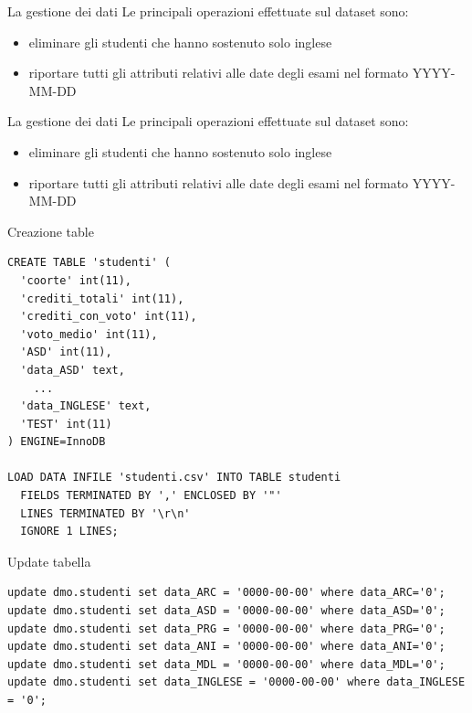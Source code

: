 \documentclass{beamer}
\begin{document}
    \begin{frame}{La gestione dei dati}
        Le principali operazioni effettuate sul dataset sono:
        \begin{itemize}
            \item eliminare gli studenti che hanno sostenuto solo inglese
            \item riportare tutti gli attributi relativi alle date degli esami nel formato YYYY-MM-DD
        \end{itemize}
    \end{frame}

    \begin{frame}{La gestione dei dati}
        Le principali operazioni effettuate sul dataset sono:
        \begin{itemize}
            \item eliminare gli studenti che hanno sostenuto solo inglese
            \item riportare tutti gli attributi relativi alle date degli esami nel formato YYYY-MM-DD
        \end{itemize}
    \end{frame}

\begin{frame}[fragile]{Creazione table}
\begin{lstlisting}[style=sql]
CREATE TABLE 'studenti' (
  'coorte' int(11),
  'crediti_totali' int(11),
  'crediti_con_voto' int(11),
  'voto_medio' int(11),
  'ASD' int(11),
  'data_ASD' text,
    ...
  'data_INGLESE' text,
  'TEST' int(11)
) ENGINE=InnoDB

LOAD DATA INFILE 'studenti.csv' INTO TABLE studenti
  FIELDS TERMINATED BY ',' ENCLOSED BY '"'
  LINES TERMINATED BY '\r\n'
  IGNORE 1 LINES; 
\end{lstlisting}
\end{frame}

\begin{frame}[fragile]{Update tabella}
\begin{lstlisting}[style=sql]
update dmo.studenti set data_ARC = '0000-00-00' where data_ARC='0'; 
update dmo.studenti set data_ASD = '0000-00-00' where data_ASD='0'; 
update dmo.studenti set data_PRG = '0000-00-00' where data_PRG='0'; 
update dmo.studenti set data_ANI = '0000-00-00' where data_ANI='0'; 
update dmo.studenti set data_MDL = '0000-00-00' where data_MDL='0';
update dmo.studenti set data_INGLESE = '0000-00-00' where data_INGLESE = '0';
\end{lstlisting}
\end{frame}
\end{document}
